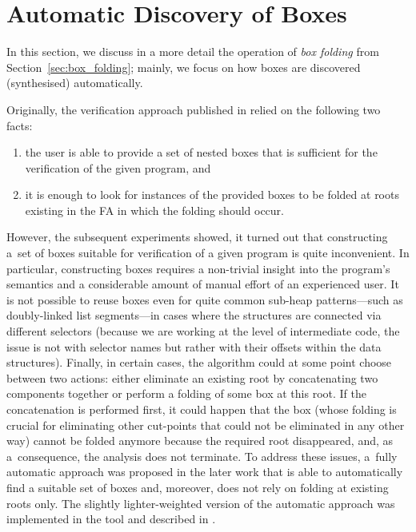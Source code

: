 
\section{Automatic Discovery of Boxes}\label{sec:box_discovery}

In this section, we discuss in a more detail the operation of \emph{box folding} from Section~\ref{sec:box_folding};
mainly, we focus on how boxes are discovered (synthesised) automatically.

Originally, the verification approach published in \cite{forester11} relied
on the following two facts:
%
\begin{enumerate}
\item the user is able to provide a set of nested boxes that is sufficient for
  the verification of the given program, and
\item it is enough to look for instances of the provided boxes to
  be folded at roots existing in the FA in which the folding should occur.
\end{enumerate}
%
However, the subsequent experiments showed, it turned out that constructing a~set of boxes
suitable for verification of a given program is quite inconvenient.
In particular, constructing boxes requires a non-trivial insight into the program's semantics and a considerable amount of manual
effort of an experienced user. 
It is not possible to reuse boxes even for quite common sub-heap patterns---such as doubly-linked list
segments---in cases where the structures are connected via different selectors
(because we are working at the level of \gcc intermediate code, the
issue is not with selector names but rather with their offsets within the data
structures).
Finally, in certain cases, the algorithm could at some point
choose between two actions:
either eliminate an existing root by concatenating two components together
or perform a folding of some box at this root.
If the concatenation is performed first, it could happen that the box (whose folding is crucial for
eliminating other cut-points that could not be eliminated in any other way)
cannot be folded anymore because the required root disappeared, and, as
a~consequence, the analysis does not terminate.
To address these issues, a~fully automatic approach was proposed in the later work \cite{boxes13} that is
able to automatically find a suitable set of boxes and, moreover, does not rely
on folding at existing roots only.
The slightly lighter-weighted version of the automatic approach was implemented in the \forester tool and
described in \cite{jiri:diza}.

